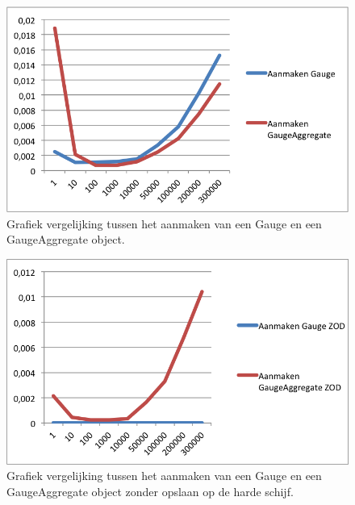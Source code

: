 \begin{figure}[!h]
  \centering
  \includegraphics[scale=1.0]{Afbeeldingen/Evaluatie/GaugeVSAggregate}
  \caption{Grafiek vergelijking tussen het aanmaken van een Gauge en een GaugeAggregate object.}
  \label{fig:GaugeVSAggregate}
\end{figure}

\begin{figure}[!h]
  \centering
  \includegraphics[scale=1.0]{Afbeeldingen/Evaluatie/GaugeVSAggregateZOD}
  \caption{Grafiek vergelijking tussen het aanmaken van een Gauge en een GaugeAggregate object zonder opslaan op de harde schijf.}
  \label{fig:GaugeVSAggregateZOD}
\end{figure}


